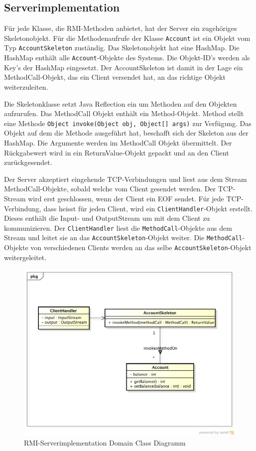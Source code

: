 \subsection{Serverimplementation}
\label{sec:serverimplementation}

Für jede Klasse, die RMI-Methoden anbietet, hat der Server ein
zuge\-hö\-ri\-ges Skeletonobjekt. Für die Methodenaufrufe
der Klasse \texttt{Account} ist ein Objekt vom Typ
\texttt{AccountSkeleton} zuständig. Das Skeletonobjekt hat eine HashMap. Die
HashMap enthält alle \texttt{Account}-Objekte des Systems. Die Objekt-ID's
werden als Key's der HashMap eingesetzt. Der AccountSkeleton ist damit
in der Lage ein MethodCall-Objekt, das ein Client versendet hat, an
das richtige Objekt weiterzuleiten. 

Die Skeletonklasse setzt Java Reflection ein um Methoden auf den
Objekten aufzurufen. Das MethodCall Objekt enthält ein
Method-Objekt. Method stellt eine Methode \verb|Object invoke(Object obj, Object[] args)|\- zur\- Ver\-füg\-ung. Das Objekt auf dem die Methode
ausgeführt hat, beschafft sich der Skeleton aus der HashMap. Die
Argumente werden im MethodCall Objekt übermittelt. Der Rückgabewert
wird in ein ReturnValue-Objekt gepackt und an den Client zurückgesendet.

Der Server akzeptiert eingehende TCP-Verbindungen und liest aus
dem Stream MethodCall-Objekte, sobald welche vom Client gesendet
werden. Der TCP-Stream wird erst geschlossen, wenn der Client ein EOF
sendet. Für jede TCP-Verbindung, dass heisst für jeden Client, wird
ein \texttt{ClientHandler}-Objekt erstellt. Dieses enthält die Input-
und OutputStream um mit dem Client zu kommunizieren. Der
\texttt{ClientHandler} liest die \texttt{MethodCall}-Objekte aus dem
Stream und leitet sie an das \texttt{AccountSkeleton}-Objekt weiter. Die
\texttt{Method\-Call}-Objekte von verschiedenen Clients werden an das selbe
\-\texttt{Ac\-count\-Skeleton}-Objekt weitergeleitet.

\begin{figure}[ht]
  \centering
\includegraphics[scale = 0.5]{images_objectcaching/rmiServerImpl}  
  \caption{RMI-Serverimplementation Domain Class Diagramm}
  \label{fig:rmiserverimpl}
\end{figure}

